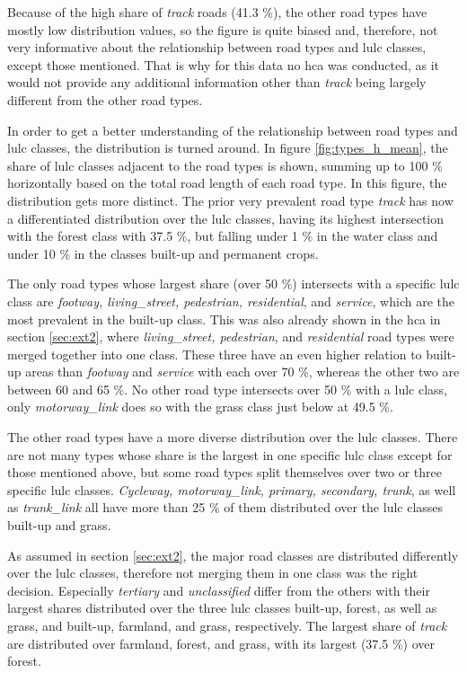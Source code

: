 Because of the high share of \emph{track} roads (41.3 \%), the other road types have mostly low distribution values, so the figure is quite biased and, therefore, not very informative about the relationship between road types and \gls{lulc} classes, except those mentioned. That is why for this data no \gls{hca} was conducted, as it would not provide any additional information other than \emph{track} being largely different from the other road types.

In order to get a better understanding of the relationship between road types and \gls{lulc} classes, the distribution is turned around. In figure \ref{fig:types_h_mean}, the share of \gls{lulc} classes adjacent to the road types is shown, summing up to 100 \% horizontally based on the total road length of each road type. In this figure, the distribution gets more distinct. The prior very prevalent road type \emph{track} has now a differentiated distribution over the \gls{lulc} classes, having its highest intersection with the forest class with 37.5 \%, but falling under 1 \% in the water class and under 10 \% in the classes built-up and permanent crops.

The only road types whose largest share (over 50 \%) intersects with a specific \gls{lulc} class are \emph{footway, living\_street, pedestrian, residential}, and \emph{service}, which are the most prevalent in the built-up class. This was also already shown in the \gls{hca} in section \ref{sec:ext2}, where \emph{living\_street, pedestrian}, and \emph{residential} road types were merged together into one class. These three have an even higher relation to built-up areas than \emph{footway} and \emph{service} with each over 70 \%, whereas the other two are between 60 and 65 \%. No other road type intersects over 50 \% with a \gls{lulc} class, only \emph{motorway\_link} does so with the grass class just below at 49.5 \%.

The other road types have a more diverse distribution over the \gls{lulc} classes. There are not many types whose share is the largest in one specific \gls{lulc} class except for those mentioned above, but some road types split themselves over two or three specific \gls{lulc} classes. \emph{Cycleway, motorway\_link, primary, secondary, trunk}, as well as \emph{trunk\_link} all have more than 25 \% of them distributed over the \gls{lulc} classes built-up and grass.  

As assumed in section \ref{sec:ext2}, the major road classes are distributed differently over the \gls{lulc} classes, therefore not merging them in one class was the right decision. Especially \emph{tertiary} and \emph{unclassified} differ from the others with their largest shares distributed over the three \gls{lulc} classes built-up, forest, as well as grass, and built-up, farmland, and grass, respectively. The largest share of \emph{track} are distributed over farmland, forest, and grass, with its largest (37.5 \%) over forest.

